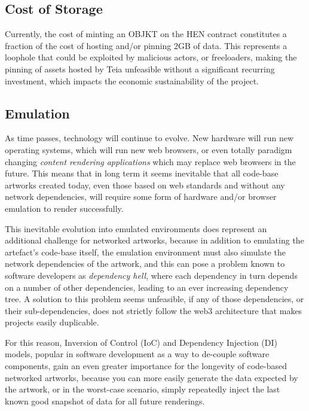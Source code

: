 \subsection{Cost of Storage}

Currently, the cost of minting an OBJKT on the HEN contract constitutes a fraction of the cost of hosting and/or pinning 2GB of data. This represents a loophole that could be exploited by malicious actors, or freeloaders, making the pinning of assets hosted by Teia unfeasible without a significant recurring investment, which impacts the economic sustainability of the project.

\subsection{Emulation}

As time passes, technology will continue to evolve. New hardware will run new operating systems, which will run new web browsers, or even totally paradigm changing \emph{content rendering applications} which may replace web browsers in the future. This means that in long term it seems inevitable that all code-base artworks created today, even those based on web standards and without any network dependencies, will require some form of hardware and/or browser emulation to render successfully. 

This inevitable evolution into emulated environments does represent an additional challenge for networked artworks, because in addition to emulating the artefact's code-base itself, the emulation environment must also simulate the network dependencies of the artwork, and this can pose a problem known to software developers as \emph{dependency hell}, where each dependency in turn depends on a number of other dependencies, leading to an ever increasing dependency tree. A solution to this problem seems unfeasible, if any of those dependencies, or their sub-dependencies, does not strictly follow the web3 architecture that makes projects easily duplicable.

For this reason, Inversion of Control (IoC) \cite{fowlerInversionControl2005} and Dependency Injection (DI) \cite{martinOODesignQuality1994} models, popular in software development as a way to de-couple software components, gain an even greater importance for the longevity of code-based networked artworks, because you can more easily generate the data expected by the artwork, or in the worst-case scenario, simply repeatedly inject the last known good snapshot of data for all future renderings.

